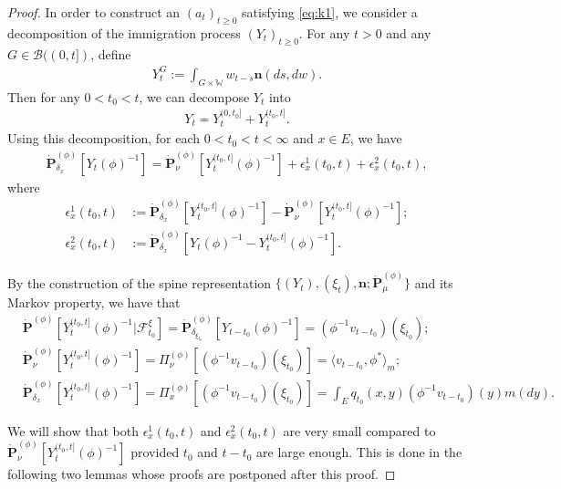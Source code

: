 \documentclass[12pt,a4paper]{amsart}
\theoremstyle{definition}
\numberwithin{equation}{section}
\begin{document}
\begin{proof}
  In order to construct an $(a_t)_{t\geq 0}$ satisfying \eqref{eq:k1}, we consider a decomposition of the immigration process $(Y_t)_{t\geq 0}$.
  For any $t>0$ and any $G\in \mathscr B((0,t])$, define
  \begin{align}
    Y^G_t
    := \int_{G\times \mathbb W} w_{t-s} \mathbf n(ds,dw).
  \end{align}
  Then for any $0 < t_0 < t$, we can decompose $Y_t$ into
  \begin{align}
    Y_t
    = Y^{(0,t_0]}_t + Y^{(t_0,t]}_t.
  \end{align}
  Using this decomposition, for each $0<t_0<t<\infty$ and $x\in E$, we have
  \begin{align}
    \label{eq: starting point of phi-1v_t(x)}
    \dot{\mathbf P}_{\delta_x}^{(\phi)}[Y_t(\phi)^{-1}]
    = \dot {\mathbf P}_\nu^{(\phi)} [Y^{(t_0,t]}_t(\phi)^{-1}] + \epsilon_x^1(t_0,t) +\epsilon_x^2(t_0,t),
  \end{align}
  where
  \begin{align}
    \epsilon_x^1(t_0,t)
    &:= \dot {\mathbf P}_{\delta_x}^{(\phi)} [Y^{(t_0,t]}_t(\phi)^{-1}] - \dot {\mathbf P}_\nu^{(\phi)} [Y^{(t_0,t]}_t(\phi)^{-1}];
    \\\epsilon_x^2(t_0,t)
    &:= \dot{\mathbf P}_{\delta_x}^{(\phi)}[Y_t(\phi)^{-1} - Y^{(t_0,t]}_t(\phi)^{-1}].
  \end{align}

  By the construction of the spine representation $\{(Y_t), (\xi_t),\mathbf n; \dot {\mathbf P}^{(\phi)}_\mu\}$ and its Markov property, we have that
  \begin{align}
    \label{eq: some equations for PY-1-1}
    &\dot{\mathbf P}^{(\phi)} [Y_t^{(t_0,t]}(\phi)^{-1}|\mathscr F^\xi_{t_0}]
      = \dot{\mathbf P}_{\delta_{\xi_{t_0}}}^{(\phi)}  [Y_{t-t_0}(\phi)^{-1}]
      = (\phi^{-1}v_{t-t_0})(\xi_{t_0});
    \\ \label{eq: some equations for PY-1-2}
    &\dot{\mathbf P}_\nu^{(\phi)}[Y_t^{(t_0,t]}(\phi)^{-1}]
      = \Pi_{\nu}^{(\phi)}[(\phi^{-1}v_{t-t_0})(\xi_{t_0}) ]
      = \langle v_{t-t_0},\phi^* \rangle_m;
    \\ \label{eq: some equations for PY-1-3}
    &\dot{\mathbf P}_{\delta_x}^{(\phi)}[Y_t^{(t_0,t]}(\phi)^{-1}]
      = \Pi_x^{(\phi)}[(\phi^{-1}v_{t-t_0})(\xi_{t_0}) ]
      = \int_E  q_{t_0}(x,y)(\phi^{-1}v_{t-t_0})(y) m(dy).
  \end{align}


  We will show that both $\epsilon_x^1(t_0,t)$ and $\epsilon_x^2(t_0,t)$ are very small compared to $\dot {\mathbf P}_\nu^{(\phi)}[Y_t^{(t_0,t]}(\phi)^{-1}]$ provided $t_0$ and $t- t_0$ are large enough.
  This is done in the following two lemmas whose proofs are postponed after this proof.


\end{proof}
\end{document}
